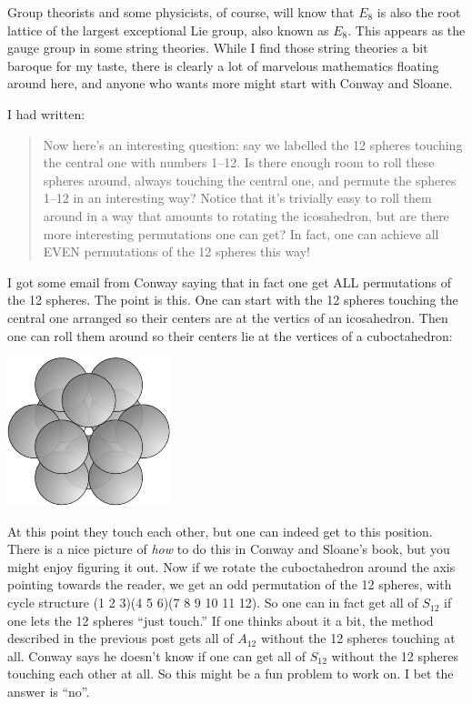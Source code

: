 Group theorists and some physicists, of course, will know that $E_8$ is also the root lattice of the largest exceptional Lie group, also known as $E_8$. This appears as the gauge group in some string theories. While I find those string theories a bit baroque for my taste, there is clearly a lot of marvelous mathematics floating around here, and anyone who wants more might start with Conway and Sloane.

\Addendum

I had written:
\begin{quote}
Now here's an interesting question: say we labelled the 12 spheres touching the central one with numbers 1--12. Is there enough room to roll these spheres around, always touching the central one, and permute the spheres 1--12 in an interesting way? Notice that it's trivially easy to roll them around in a way that amounts to rotating the icosahedron, but are there more interesting permutations one can get?
In fact, one can achieve all EVEN permutations of the 12 spheres this way!
\end{quote}
I got some email from Conway saying that in fact one get ALL permutations of the 12 spheres. The point is this. One can start with the 12 spheres touching the central one arranged so their centers are at the vertics of an icosahedron. Then one can roll them around so their centers lie at the vertices of a cuboctahedron:
\begin{center}
\includegraphics[]{figures/wk20_fig5.pdf}
\end{center}
%
% 
%
%
At this point they touch each other, but one can indeed get to this position. There is a nice picture of \emph{how} to do this in Conway and Sloane's book, but you might enjoy figuring it out.
Now if we rotate the cuboctahedron around the axis pointing towards the reader, we get an odd permutation of the 12 spheres, with cycle structure (1 2 3)(4 5 6)(7 8 9 10 11 12). So one can in fact get all of $S_{12}$ if one lets the 12 spheres ``just touch.'' If one thinks about it a bit, the method described in the previous post gets all of $A_{12}$ without the 12 spheres touching at all. Conway says he doesn't know if one can get all of $S_{12}$ without the 12 spheres touching each other at all. So this might be a fun problem to work on. I bet the answer is ``no''.


